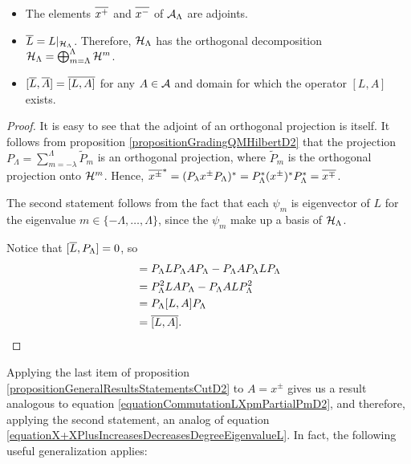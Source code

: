 \begin{proposition}\label{propositionGeneralResultsStatementsCutD2}
\hfill
    \begin{itemize}
        
    \item The elements $\overline{x^+}$ and $\overline{x^-}$ of $\mathcal A_\Lambda$ are adjoints.
    
    \item $\overline{L} = L|_{\mathcal H_\Lambda}$. Therefore, $\mathcal H_\Lambda$ has the orthogonal decomposition $\mathcal H_\Lambda = \bigoplus_{m = \Lambda}^\Lambda \mathcal H^m$.
    
    \item $[\overline{L}, \overline{A}] = \overline{[L, A]}$ for any $A \in \mathcal A$ and domain for which the operator $[L, A]$ exists.
        
    \end{itemize}
\end{proposition}
\begin{proof}
It is easy to see that the adjoint of an orthogonal projection is itself. It follows from proposition \ref{propositionGradingQMHilbertD2} that the projection $P_\Lambda = \sum_{m = -\lambda}^\Lambda \tilde P_m$ is an orthogonal projection, where $\tilde P_m$ is the orthogonal projection onto $\mathcal H^m$. Hence, $\overline{x^\pm}^* = (P_\lambda x^\pm P_\Lambda)^* = P_\Lambda^* (x^\pm)^* P_\Lambda^* = \overline{x^\mp}$.

The second statement follows from the fact that each $\psi_m$ is eigenvector of $L$ for the eigenvalue $m \in \{-\Lambda, \dots, \Lambda\}$, since the $\psi_m$ make up a basis of $\mathcal H_\Lambda$.

Notice that $[\overline{L}, P_\Lambda] = 0$, so
\begin{align*}
    [\cut L, \cut A] 
        &= P_\Lambda L P_\Lambda A P_\Lambda - P_\Lambda A P_\Lambda L P_\Lambda \\
        &= P_\Lambda^2 L A P_\Lambda - P_\Lambda A L P_\Lambda^2\\
        &= P_\Lambda [L, A] P_\Lambda\\
        &= \cut{[L, A]}.
\end{align*}
\end{proof}

Applying the last item of proposition \ref{propositionGeneralResultsStatementsCutD2} to $A = x^\pm$ gives us a result analogous to equation \eqref{equationCommutationLXpmPartialPmD2}, and therefore, applying the second statement, an analog of equation \eqref{equationX+XPlusIncreasesDecreasesDegreeEigenvalueL}. In fact, the following useful generalization applies:

